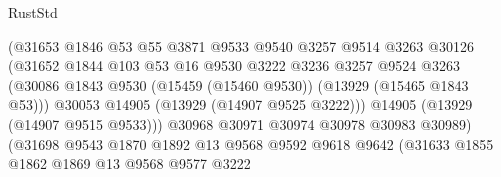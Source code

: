 \begin{lexlean}{RustStd}
\begin{coremodule}
                                      (@31653
                                        @1846
                                        @53
                                        @55
                                        @3871
                                        @9533
                                        @9540
                                        @3257
                                        @9514
                                        @3263
                                        @30126
                                        (@31652
                                          @1844
                                          @103
                                          @53
                                          @16
                                          @9530
                                          @3222
                                          @3236
                                          @3257
                                          @9524
                                          @3263
                                          (@30086
                                            @1843
                                            @9530
                                            (@15459 (@15460 @9530))
                                            (@13929 (@15465 @1843 @53)))
                                          @30053
                                          @14905
                                          (@13929 (@14907 @9525 @3222)))
                                        @14905
                                        (@13929 (@14907 @9515 @9533)))
                                      @30968
                                      @30971
                                      @30974
                                      @30978
                                      @30983
                                      @30989)
                                    (@31698
                                      @9543
                                      @1870
                                      @1892
                                      @13
                                      @9568
                                      @9592
                                      @9618
                                      @9642
                                      (@31633
                                        @1855
                                        @1862
                                        @1869
                                        @13
                                        @9568
                                        @9577
                                        @3222

\end{coremodule}
\end{lexlean}
